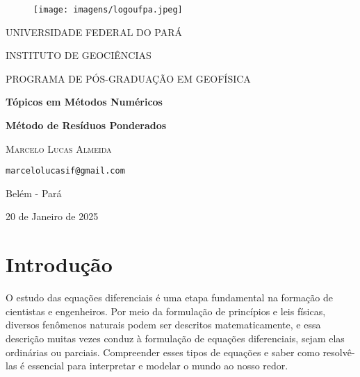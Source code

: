 \documentclass[a4paper, 12pt]{article}
\numberwithin{equation}{section}
\begin{document}
\begin{titlepage}
	\begin{center}
		\begin{figure}[!htp]
			\centering
			\texttt{[image: imagens/logoufpa.jpeg]}
		\end{figure}
	\vspace{0.5cm}
	
	{\Large UNIVERSIDADE FEDERAL DO PARÁ} 
	\vspace{0.5cm}
	
	{\Large INSTITUTO DE GEOCIÊNCIAS} 
	\vspace{0.5cm}
	
		{\Large PROGRAMA DE PÓS-GRADUAÇÃO EM GEOFÍSICA}
	
	\vspace{2cm}
	
	{\Large \textbf{Tópicos em Métodos Numéricos }}

    \vspace{0.5cm}

    {\large \textbf{Método de Resíduos Ponderados}}
	
	\vspace{1cm}
	
	{\textsc{Marcelo Lucas Almeida}}

    \vspace{2cm}

    {\texttt{marcelolucasif@gmail.com}}
	

\vspace{2cm}

	Belém - Pará  \\ 
	
	\vspace{0.5cm}
	
	20 de Janeiro de 2025

	
	
	\end{center}




\end{titlepage}
    




\section{Introdução }
O estudo das equações diferenciais é uma etapa fundamental na formação de cientistas e engenheiros. Por meio da formulação de princípios e leis físicas, diversos fenômenos naturais podem ser descritos matematicamente, e essa descrição muitas vezes conduz à formulação de equações diferenciais, sejam elas ordinárias ou parciais. Compreender esses tipos de equações e saber como resolvê-las é essencial para interpretar e modelar o mundo ao nosso redor.
\end{document}
